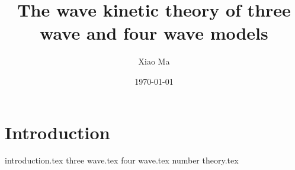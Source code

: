 \documentclass{puthesis-UG}
\title{The wave kinetic theory of three wave and four wave models}
\author{Xiao Ma}
\date{\today}
\theoremstyle{definition}
\theoremstyle{remark}
\numberwithin{equation}{section}
\begin{document}
\chapter{Introduction}

{introduction.tex}
{three wave.tex}
{four wave.tex}
{number theory.tex}




 

\end{document}
